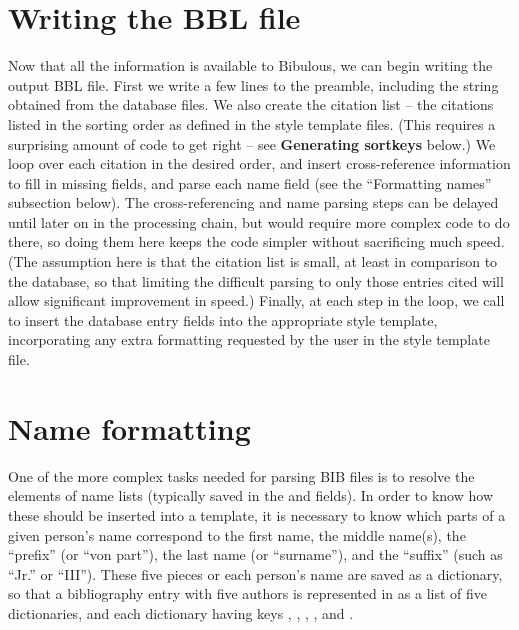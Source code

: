\documentclass[letterpaper,10pt,english]{sphinxmanual}
\begin{document}
\section{Writing the BBL file}
\label{developer_guide:writing-the-bbl-file}
Now that all the information is available to Bibulous, we can begin writing the output BBL file. First we write a few lines to the preamble, including the  string obtained from the  database files. We also create the citation list -- the citations listed in the sorting order as defined in the style template files. (This requires a surprising amount of code to get right -- see \textbf{Generating sortkeys} below.) We loop over each citation in the desired order, and insert cross-reference information to fill in missing fields, and parse each name field (see the ``Formatting names'' subsection below). The cross-referencing and name parsing steps can be delayed until later on in the processing chain, but would require more complex code to do there, so doing them here keeps the code simpler without sacrificing much speed. (The assumption here is that the citation list is small, at least in comparison to the database, so that limiting the difficult parsing to only those entries cited will allow significant improvement in speed.) Finally, at each step in the loop, we call  to insert the database entry fields into the appropriate style template, incorporating any extra formatting requested by the user in the style template file.


\section{Name formatting}
\label{developer_guide:name-formatting}
One of the more complex tasks needed for parsing BIB files is to resolve the elements of name lists (typically saved in the  and  fields). In order to know how these should be inserted into a template, it is necessary to know which parts of a given person's name correspond to the first name, the middle name(s), the ``prefix'' (or ``von part''), the last name (or ``surname''), and the ``suffix'' (such as ``Jr.'' or ``III''). These five pieces or each person's name are saved as a dictionary, so that a bibliography entry with five authors is represented in  as a list of five dictionaries, and each dictionary having keys , , , , and .
\end{document}
